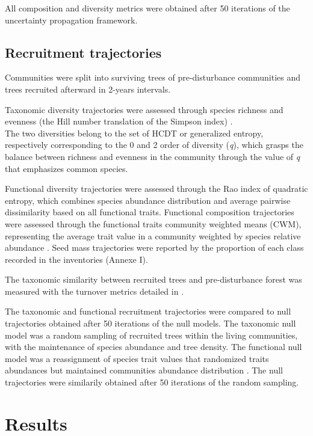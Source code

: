 \documentclass[fleqn,10pt]{ArtEcoFoG} %
\begin{document}
All composition and diversity metrics were obtained after 50 iterations
of the uncertainty propagation framework.

\subsection{Recruitment trajectories}\label{recruitment-trajectories}

Communities were split into surviving trees of pre-disturbance
communities and trees recruited afterward in 2-years intervals.

Taxonomic diversity trajectories were assessed through species richness
and evenness (the Hill number translation of the Simpson index)
\citep{chao2015, Marcon2015b}.\\
The two diversities belong to the set of HCDT or generalized entropy,
respectively corresponding to the 0 and 2 order of diversity (\emph{q}),
which grasps the balance between richness and evenness in the community
through the value of \emph{q} that emphasizes common species.

Functional diversity trajectories were assessed through the Rao index of
quadratic entropy, which combines species abundance distribution and
average pairwise dissimilarity based on all functional traits.
Functional composition trajectories were assessed through the functional
traits community weighted means (CWM), representing the average trait
value in a community weighted by species relative abundance
\citep{Diaz2007}. Seed mass trajectories were reported by the proportion
of each class recorded in the inventories (Annexe I).

The taxonomic similarity between recruited trees and pre-disturbance
forest was measured with the turnover metrics detailed in
\citet{Podani2013a}.

The taxonomic and functional recruitment trajectories were compared to
null trajectories obtained after 50 iterations of the null models. The
taxonomic null model was a random sampling of recruited trees within the
living communities, with the maintenance of species abundance and tree
density. The functional null model was a reassignment of species trait
values that randomized traits abundances but maintained communities
abundance distribution \citep{Mason2013}. The null trajectories were
similarily obtained after 50 iterations of the random sampling.

\section{Results}\label{results}
\end{document}
